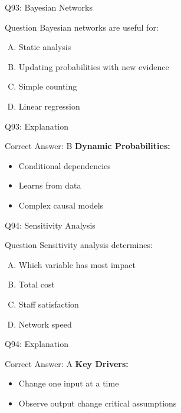 \documentclass{beamer}
\begin{document}
			\begin{frame}{Q93: Bayesian Networks}
				\begin{block}{Question}
					Bayesian networks are useful for:
				\end{block}
				\begin{enumerate}[(A)]
					\item Static analysis
					\item Updating probabilities with new evidence
					\item Simple counting
					\item Linear regression
				\end{enumerate}
			\end{frame}
			\begin{frame}{Q93: Explanation}
				\begin{block}{Correct Answer: B}
					\textbf{Dynamic Probabilities:}
					\begin{itemize}
						\item Conditional dependencies
						\item Learns from data
						\item Complex causal models
					\end{itemize}
				\end{block}
			\end{frame}
			
			\begin{frame}{Q94: Sensitivity Analysis}
				\begin{block}{Question}
					Sensitivity analysis determines:
				\end{block}
				\begin{enumerate}[(A)]
					\item Which variable has most impact
					\item Total cost
					\item Staff satisfaction
					\item Network speed
				\end{enumerate}
			\end{frame}
			\begin{frame}{Q94: Explanation}
				\begin{block}{Correct Answer: A}
					\textbf{Key Drivers:}
					\begin{itemize}
						\item Change one input at a time
						\item Observe output change
						\identifies critical assumptions
					\end{itemize}
				\end{block}
			\end{frame}
			
\end{document}
